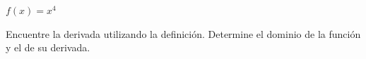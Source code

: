 \item $f(x) = x^4$
\par
Encuentre la derivada utilizando la definición. Determine el dominio de la función y el de su derivada.
